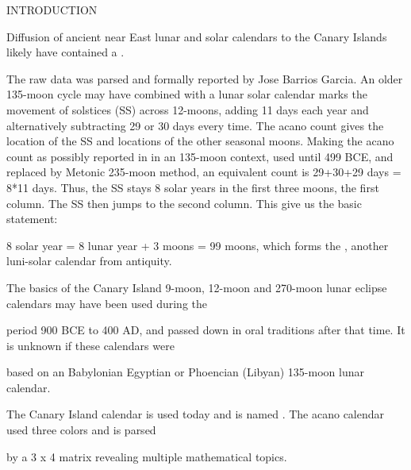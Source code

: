 \documentclass[12pt]{article}
\begin{document}
INTRODUCTION 

Diffusion of ancient near East lunar and solar calendars to the Canary Islands likely have contained a . 


The raw data was parsed and formally reported by Jose Barrios Garcia. An older  135-moon  cycle may have combined with a lunar solar calendar marks the movement of solstices (SS) across 12-moons, adding 11  days each year and alternatively subtracting 29 or 30 days every time. The acano count gives the location of the SS and locations of the other seasonal moons. Making the acano count as possibly reported in  in an 135-moon context, used until 499 BCE, and replaced  by Metonic 235-moon method, an equivalent count is 29+30+29 days = 8*11 days. Thus, the SS stays 8 solar years in the  first three moons, the first column. The SS then jumps to the second column. This give us the basic statement:

8 solar year = 8 lunar year + 3 moons = 99 moons, which forms the , another luni-solar calendar from antiquity.

The basics of the Canary Island 9-moon, 12-moon and 270-moon lunar eclipse calendars may have been used during the 

period 900  BCE to 400 AD, and passed down in oral traditions after that time. It is unknown if these calendars were 

based on an Babylonian Egyptian or Phoencian (Libyan) 135-moon lunar calendar. 

The Canary Island calendar is used today and is named . The acano calendar used three colors and is parsed

by a 3 x  4 matrix revealing multiple mathematical topics. 
\end{document}
